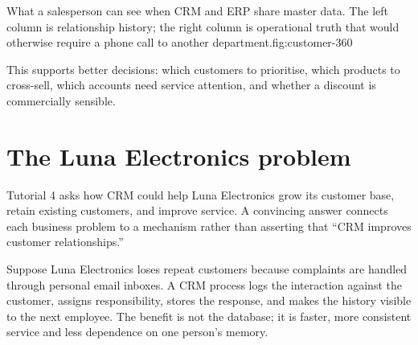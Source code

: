 \begin{utpfig}{What a salesperson can see when CRM
and ERP share master data. The left column is relationship history; the right
column is operational truth that would otherwise require a phone call to another
department.}{fig:customer-360}
\end{utpfig}

This supports better decisions: which customers to prioritise, which products to
cross-sell, which accounts need service attention, and whether a discount is
commercially sensible.

\section{The Luna Electronics problem}

Tutorial 4 asks how CRM could help Luna Electronics grow its customer base,
retain existing customers, and improve service. A convincing answer connects
each business problem to a mechanism rather than asserting that ``CRM improves
customer relationships.''

\begin{workedexample}
Suppose Luna Electronics loses repeat customers because complaints are handled
through personal email inboxes. A CRM process logs the interaction against the
customer, assigns responsibility, stores the response, and makes the history
visible to the next employee. The benefit is not the database; it is faster,
more consistent service and less dependence on one person's memory.
\end{workedexample}


